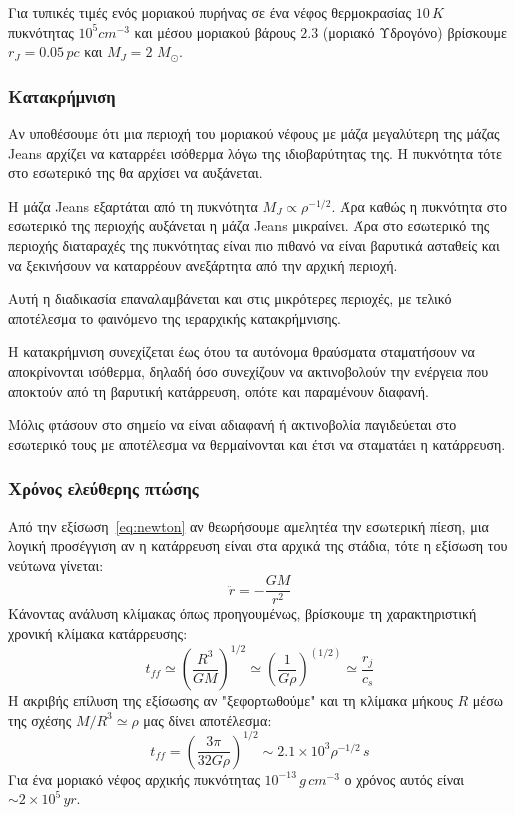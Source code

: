 \documentclass[a4paper,12pt]{memoir}
\newcommand{\sm}{$M_{\odot}$}
\begin{document}
Για τυπικές τιμές ενός μοριακού πυρήνας σε ένα νέφος θερμοκρασίας $10 \, K$ πυκνότητας $10^5 cm^{-3}$ και μέσου μοριακού βάρους $2.3$ (μοριακό Υδρογόνο) βρίσκουμε $r_J=0.05 \,pc$ και $M_J =2$ \sm.

\subsubsection{Κατακρήμνιση}
Αν υποθέσουμε ότι μια περιοχή του μοριακού νέφους με μάζα μεγαλύτερη της μάζας Jeans αρχίζει να καταρρέει ισόθερμα λόγω της ιδιοβαρύτητας της. Η πυκνότητα τότε στο εσωτερικό της θα αρχίσει να αυξάνεται. 

Η μάζα Jeans εξαρτάται από τη πυκνότητα $M_J \propto \rho ^{-1/2}$. Άρα καθώς η πυκνότητα στο εσωτερικό της περιοχής αυξάνεται η μάζα Jeans μικραίνει. Άρα στο εσωτερικό της περιοχής διαταραχές της πυκνότητας είναι πιο πιθανό να είναι βαρυτικά ασταθείς και να ξεκινήσουν να καταρρέουν ανεξάρτητα από την αρχική περιοχή.

Αυτή η διαδικασία επαναλαμβάνεται και στις μικρότερες περιοχές, με τελικό αποτέλεσμα το φαινόμενο της ιεραρχικής κατακρήμνισης.

Η κατακρήμνιση συνεχίζεται έως ότου τα αυτόνομα θραύσματα σταματήσουν να αποκρίνονται ισόθερμα, δηλαδή όσο συνεχίζουν να ακτινοβολούν την ενέργεια που αποκτούν από τη βαρυτική κατάρρευση, οπότε και παραμένουν διαφανή. 

Μόλις φτάσουν στο σημείο να είναι αδιαφανή ή ακτινοβολία παγιδεύεται στο εσωτερικό τους με αποτέλεσμα να θερμαίνονται και έτσι να σταματάει η κατάρρευση.

\subsubsection{Χρόνος ελεύθερης πτώσης}
\label{par:freefall}
Από την εξίσωση~\ref{eq:newton} αν θεωρήσουμε αμελητέα την εσωτερική πίεση, μια λογική προσέγγιση αν η κατάρρευση είναι στα αρχικά της στάδια, τότε η εξίσωση του νεύτωνα γίνεται:
\begin{equation}
\ddot{r}=-\frac{GM}{r^2}
\end{equation}
Κάνοντας ανάλυση κλίμακας όπως προηγουμένως, βρίσκουμε τη χαρακτηριστική χρονική κλίμακα κατάρρευσης:
\begin{equation}
t_{ff}\simeq \left(\frac{R^3}{GM}\right)^{1/2} \simeq \left( \frac{1}{G \rho}\right) ^(1/2) \simeq \frac{r_j}{c_s} 
\end{equation}
Η ακριβής επίλυση της εξίσωσης αν "ξεφορτωθούμε" και τη κλίμακα μήκους $R$ μέσω της σχέσης $M/R^3 \simeq \rho$ μας δίνει αποτέλεσμα:
\begin{equation}
t_{ff}=\left( \frac{3 \pi}{32 G \rho}\right) ^{1/2} \sim 2.1\times 10^3 \rho ^{-1/2} \, s
\end{equation}
Για ένα μοριακό νέφος αρχικής πυκνότητας $10^{-13}\, g\,cm^{-3}$ ο χρόνος αυτός είναι $\sim 2\times 10^5 \, yr$. 
\end{document}
